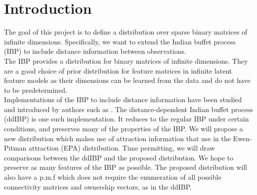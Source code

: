 \chapter{Introduction} %

The goal of this project is to define a distribution over sparse binary
matrices of infinite dimensions. Specifically, we want to extend the Indian
buffet process (IBP) to include distance information between observations.\\

\noindent
The IBP provides a distribution for binary matrices of infinite dimensions.
They are a good choice of prior distribution for feature matrices in infinite
latent feature models as their dimensions can be learned from the data and do
not have to be predetermined.\\

\noindent
Implementations of the IBP to include distance information have been studied
and introduced by authors such as \cite{ddibp}. The distance-dependent Indian
buffet process (ddIBP) is one such implementation. It reduces to the regular
IBP under certain conditions, and preserves many of the properties of the IBP.
We will propose a new distribution which makes use of attraction information
that \cite{epa} use in the Ewen-Pitman attraction (EPA) distribution. Time
permitting, we will draw comparisons between the ddIBP and the proposed
distribution.  We hope to preserve as many features of the IBP as possible. The
proposed distribution will also have a p.m.f which does not require the
enumeration of all possible connectivity matrices and ownership vectors, as in
the ddIBP.\\
